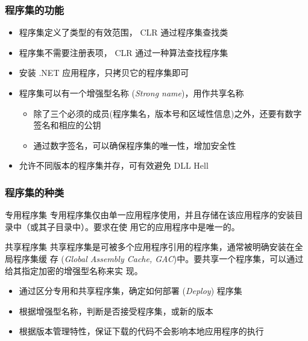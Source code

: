 \begin{frame}
\frametitle{程序集的功能}
\begin{itemize}
  \setlength{\itemsep}{10pt plus 1pt}
\item 程序集定义了类型的有效范围， CLR 通过程序集查找类
\item 程序集不需要注册表项， CLR 通过一种算法查找程序集
\item 安装 .NET 应用程序，只拷贝它的程序集即可\pause
\item 程序集可以有一个{增强型名称} (\textit{Strong name})，用作共享名称
  \begin{itemize}
  \item 除了三个必须的成员(程序集名，版本号和区域性信息)之外，还要有数字签名和相应的公钥
  \item 通过数字签名，可以确保程序集的唯一性，增加安全性
  \end{itemize}

\item 允许不同版本的程序集并存，可有效避免 DLL Hell
\end{itemize}
\end{frame}

\begin{frame}
\frametitle{程序集的种类}

\begin{block}{专用程序集}
  \CJKindent \small 专用程序集仅由单一应用程序使用，并且存储在该应用程序的安装目录中（或其子目录中）。要求在使
  用它的应用程序中是唯一的。
\end{block}
\pause
\begin{block}{共享程序集}
  \CJKindent \small 共享程序集是可被多个应用程序引用的程序集，通常被明确安装在全局程序集缓
  存 (\textit{Global Assembly Cache, GAC})中。要共享一个程序集，可以通过给其指定加密的增强型名称来实
  现。
\end{block}
\pause
\begin{itemize}
\item 通过区分专用和共享程序集，确定如何{部署} (\textit{Deploy}) 程序集
\item 根据增强型名称，判断是否接受程序集，或新的版本
\item 根据版本管理特性，保证下载的代码不会影响本地应用程序的执行
\end{itemize}

\end{frame}

